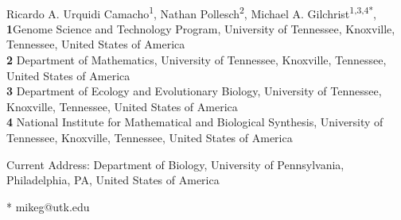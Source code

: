 \documentclass[10pt,letterpaper]{article}
\begin{document}
\vspace*{0.2in}
\begin{flushleft}
  {\Large
    \textbf{} %
  }
  \newline
  \\
  Ricardo A. Urquidi Camacho\textsuperscript{1\textcurrency},
  Nathan Pollesch\textsuperscript{2},
  Michael A. Gilchrist\textsuperscript{1,3,4*},
  \\
  \bigskip
  \textbf{1}Genome Science and Technology Program, University of Tennessee, Knoxville, Tennessee, United States of America
  \\
  \textbf{2} Department of Mathematics, University of Tennessee,  Knoxville, Tennessee, United States of America
  \\
  \textbf{3} Department of Ecology and Evolutionary Biology, University of Tennessee, Knoxville, Tennessee, United States of America
  \\
  \textbf{4} National Institute for Mathematical and Biological Synthesis, University of Tennessee, Knoxville, Tennessee, United States of America
  \\
  \bigskip

  \textcurrency Current Address: Department of Biology, University of Pennsylvania, Philadelphia, PA, United States of America %

  * mikeg@utk.edu

\end{flushleft}
\end{document}

